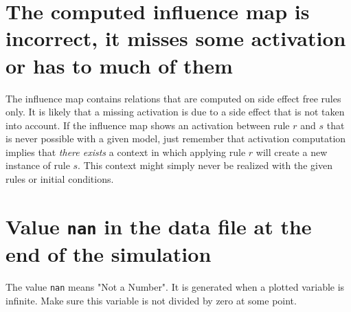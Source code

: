 \documentclass[11pt]{book}
\def\ttt#1{\texttt{#1}}
\begin{document}
\section*{The computed influence map is incorrect, it misses some activation or has to much of them}
The influence map contains relations that are computed on side effect free rules only. It is likely that a missing activation is due to a side effect that is not taken into account. If the influence map shows an activation between rule $r$ and $s$ that is never possible with a given model, just remember that activation computation implies that \emph{there exists} a context in which applying rule $r$ will create a new instance of rule $s$. This context might simply never be realized with the given rules or initial conditions.

\section*{Value \ttt{nan} in the data file at the end of the simulation}
The value \ttt{nan} means "Not a Number". It is generated when a plotted variable is infinite. Make sure this variable is not divided by zero at some point.


 

\printindex
\end{document}
